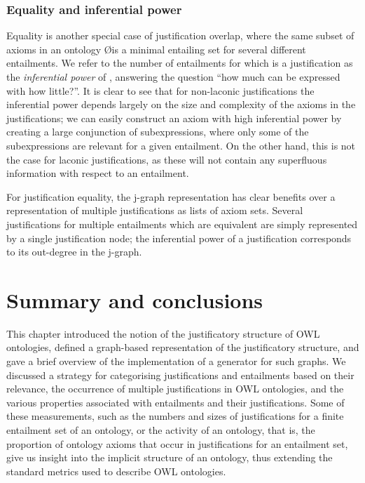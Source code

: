 \subsubsection{Equality and inferential power}
Equality is another special case of justification overlap, where the same subset \J of axioms in an ontology \O is a minimal entailing set for several different entailments. We refer to the number of entailments for which \J is a justification as the \emph{inferential power} of \J, answering the question \enquote{how much can be expressed with how little?}. It is clear to see that for non-laconic justifications the inferential power depends largely on the size and complexity of the axioms in the justifications; we can easily construct an axiom with high inferential power by creating a large conjunction of subexpressions, where only some of the subexpressions are relevant for a given entailment. On the other hand, this is not the case for laconic justifications, as these will not contain any superfluous information with respect to an entailment.

For justification equality, the j-graph representation has clear benefits over a representation of multiple justifications as lists of axiom sets. Several justifications for multiple entailments which are equivalent are simply represented by a single justification node; the inferential power of a justification corresponds to its out-degree in the j-graph. 


\section{Summary and conclusions}

This chapter introduced the notion of the justificatory structure of OWL ontologies, defined a graph-based representation of the justificatory structure, and gave a brief overview of the implementation of a generator for such graphs. We discussed a strategy for categorising justifications and entailments based on their relevance, the occurrence of multiple justifications in OWL ontologies, and the various properties associated with entailments and their justifications. Some of these measurements, such as the numbers and sizes of justifications for a finite entailment set of an ontology, or the activity of an ontology, that is, the proportion of ontology axioms that occur in justifications for an entailment set, give us insight into the implicit structure of an ontology, thus extending the standard metrics used to describe OWL ontologies.

